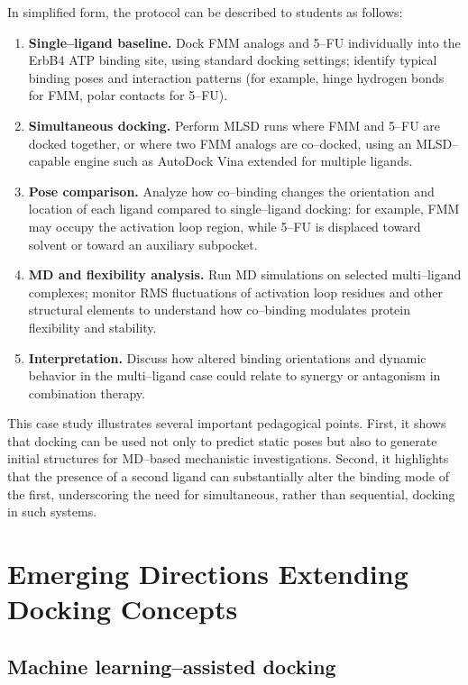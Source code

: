 \documentclass[12pt]{article}
\begin{document}
In simplified form, the protocol can be described to students as follows:

\begin{enumerate}
  \item \textbf{Single–ligand baseline.} Dock FMM analogs and 5–FU individually into the ErbB4 ATP binding site, using standard docking settings; identify typical binding poses and interaction patterns (for example, hinge hydrogen bonds for FMM, polar contacts for 5–FU).  
  \item \textbf{Simultaneous docking.} Perform MLSD runs where FMM and 5–FU are docked together, or where two FMM analogs are co–docked, using an MLSD–capable engine such as AutoDock Vina extended for multiple ligands.
  \item \textbf{Pose comparison.} Analyze how co–binding changes the orientation and location of each ligand compared to single–ligand docking: for example, FMM may occupy the activation loop region, while 5–FU is displaced toward solvent or toward an auxiliary subpocket. 
  \item \textbf{MD and flexibility analysis.} Run MD simulations on selected multi–ligand complexes; monitor RMS fluctuations of activation loop residues and other structural elements to understand how co–binding modulates protein flexibility and stability.  
  \item \textbf{Interpretation.} Discuss how altered binding orientations and dynamic behavior in the multi–ligand case could relate to synergy or antagonism in combination therapy.
\end{enumerate}

This case study illustrates several important pedagogical points.  
First, it shows that docking can be used not only to predict static poses but also to generate initial structures for MD–based mechanistic investigations.  
Second, it highlights that the presence of a second ligand can substantially alter the binding mode of the first, underscoring the need for simultaneous, rather than sequential, docking in such systems.\cite{CH14_ErbB4MLSD2024,CH14_Moldina2025}

\section{Emerging Directions Extending Docking Concepts}

\subsection{Machine learning–assisted docking}
\end{document}
